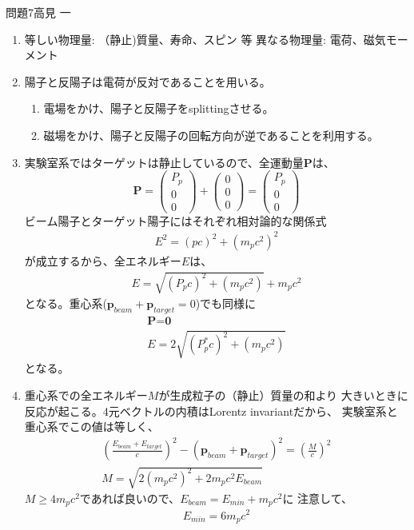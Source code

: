 \documentclass[fleqn]{jbook}
\begin{document}
\begin{answer}{問題7}{高見 一}
\begin{enumerate}
\item 
等しい物理量: （静止)質量、寿命、スピン 等  
異なる物理量: 電荷、磁気モーメント

\item 
陽子と反陽子は電荷が反対であることを用いる。
\begin{enumerate}
\item{電場をかけ、陽子と反陽子をsplittingさせる。}
\item{磁場をかけ、陽子と反陽子の回転方向が逆であることを利用する。}
\end{enumerate}

\item
実験室系ではターゲットは静止しているので、全運動量$\textbf{P}$は、
\[
\textbf{P} = \left(
\begin{array}{ccc}
P_p \\
0 \\
0 
\end{array}
\right)
+ \left(
\begin{array}{ccc}
0 \\
0 \\
0 
\end{array}
\right) 
= \left(
\begin{array}{ccc}
P_p \\
0 \\
0 
\end{array}
\right)
\]
ビーム陽子とターゲット陽子にはそれぞれ相対論的な関係式
\begin{eqnarray*}
E^2 = (pc)^2 + (m_p c^2)^2
\end{eqnarray*}
が成立するから、全エネルギー$E$は、
\begin{eqnarray*}
E = \sqrt{(P_p c)^2 + (m_p c^2)} + m_p c^2
\end{eqnarray*}
となる。重心系($\textbf{p}_{beam} + \textbf{p}_{target} =0$)でも同様に
\begin{eqnarray*}
\textbf{P} = \textbf{0} \\
E = 2 \sqrt{(P_p^* c)^2 + (m_p c^2)}
\end{eqnarray*}
となる。

\item
重心系での全エネルギー$M$が生成粒子の（静止）質量の和より
大きいときに反応が起こる。4元ベクトルの内積はLorentz invariantだから、
実験室系と重心系でこの値は等しく、
\begin{eqnarray*}
\left(\frac{E_{beam} + E_{target}}{c} \right)^2 - (\textbf{p}_{beam} + 
\textbf{p}_{target})^2 = \left(\frac{M}{c} \right)^2 \\
M = \sqrt{2(m_p c^2)^2 + 2m_p c^2 E_{beam}}
\end{eqnarray*}
$M \geq 4m_p c^2$であれば良いので、$E_{beam} = E_{min} + m_p c^2$に
注意して、
\begin{eqnarray*}
E_{min} = 6 m_p c^2
\end{eqnarray*}


\end{enumerate}
\end{answer}
\end{document}
